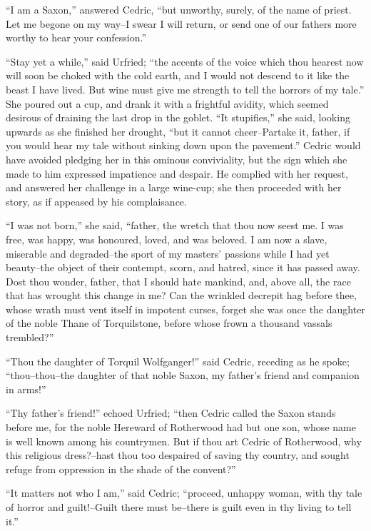 ``I am a Saxon,'' answered Cedric, ``but unworthy, surely, of the name
of priest. Let me begone on my way--I swear I will return, or send one
of our fathers more worthy to hear your confession.''

``Stay yet a while,'' said Urfried; ``the accents of the voice which
thou hearest now will soon be choked with the cold earth, and I would
not descend to it like the beast I have lived. But wine must give me
strength to tell the horrors of my tale.'' She poured out a cup, and
drank it with a frightful avidity, which seemed desirous of draining the
last drop in the goblet. ``It stupifies,'' she said, looking upwards as
she finished her drought, ``but it cannot cheer--Partake it, father, if
you would hear my tale without sinking down upon the pavement.'' Cedric
would have avoided pledging her in this ominous conviviality, but the
sign which she made to him expressed impatience and despair. He complied
with her request, and answered her challenge in a large wine-cup; she
then proceeded with her story, as if appeased by his complaisance.

``I was not born,'' she said, ``father, the wretch that thou now seest
me. I was free, was happy, was honoured, loved, and was beloved. I am
now a slave, miserable and degraded--the sport of my masters' passions
while I had yet beauty--the object of their contempt, scorn, and hatred,
since it has passed away. Dost thou wonder, father, that I should hate
mankind, and, above all, the race that has wrought this change in me?
Can the wrinkled decrepit hag before thee, whose wrath must vent itself
in impotent curses, forget she was once the daughter of the noble Thane
of Torquilstone, before whose frown a thousand vassals trembled?''

``Thou the daughter of Torquil Wolfganger!'' said Cedric, receding as he
spoke; ``thou--thou--the daughter of that noble Saxon, my father's
friend and companion in arms!''

``Thy father's friend!'' echoed Urfried; ``then Cedric called the Saxon
stands before me, for the noble Hereward of Rotherwood had but one son,
whose name is well known among his countrymen. But if thou art Cedric of
Rotherwood, why this religious dress?--hast thou too despaired of saving
thy country, and sought refuge from oppression in the shade of the
convent?''

``It matters not who I am,'' said Cedric; ``proceed, unhappy woman, with
thy tale of horror and guilt!--Guilt there must be--there is guilt even
in thy living to tell it.''

